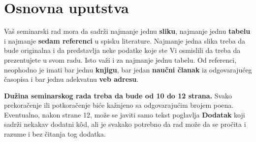 \documentclass[a4paper]{article}
\begin{document}


\section{Osnovna uputstva}
Vaš seminarski rad mora da sadrži najmanje jednu \textbf{sliku}, najmanje jednu \textbf{tabelu} i najmanje \textbf{sedam referenci} u spisku literature. Najmanje jedna slika treba da bude originalna i da predstavlja neke podatke koje ste Vi osmislili da treba da prezentujete u svom radu. Isto važi i za najmanje jednu tabelu. 	Od referenci, neophodno je imati bar jednu \textbf{knjigu}, bar jedan \textbf{naučni članak} iz odgovarajućeg časopisa i bar jednu adekvatnu \textbf{veb adresu}. 

\textbf{Dužina seminarskog rada treba da bude od 10 do 12 strana.} Svako prekoračenje ili potkoračenje biće kažnjeno sa odgovarajućim brojem poena. Eventualno, nakon strane 12, može se javiti samo tekst poglavlja \textbf{Dodatak} koji sadrži nekakav dodatni k\^{o}d, ali je svakako potrebno da rad može da se pročita i razume i bez čitanja tog dodatka. 
\end{document}
